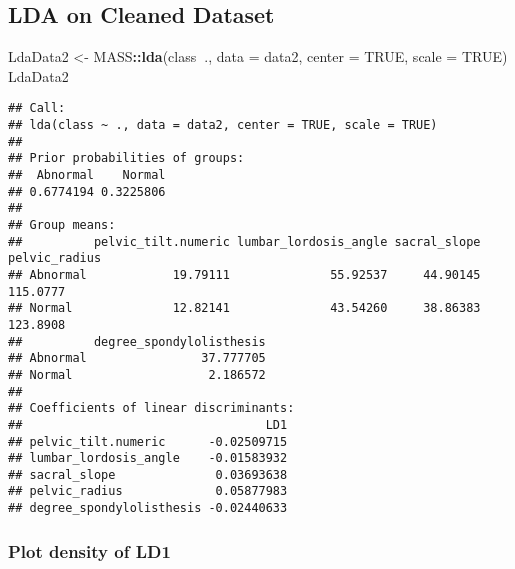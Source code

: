 \documentclass[
]{article}
\newenvironment{Shaded}{\begin{snugshade}}{\end{snugshade}}
\newcommand{\CommentTok}[1]{\textcolor[rgb]{0.56,0.35,0.01}{\textit{#1}}}
\newcommand{\DataTypeTok}[1]{\textcolor[rgb]{0.13,0.29,0.53}{#1}}
\newcommand{\KeywordTok}[1]{\textcolor[rgb]{0.13,0.29,0.53}{\textbf{#1}}}
\newcommand{\NormalTok}[1]{#1}
\newcommand{\OperatorTok}[1]{\textcolor[rgb]{0.81,0.36,0.00}{\textbf{#1}}}
\newcommand{\OtherTok}[1]{\textcolor[rgb]{0.56,0.35,0.01}{#1}}
\newcommand{\StringTok}[1]{\textcolor[rgb]{0.31,0.60,0.02}{#1}}
\begin{document}
\hypertarget{lda-on-cleaned-dataset}{%
\subsection{LDA on Cleaned Dataset}\label{lda-on-cleaned-dataset}}

\begin{Shaded}
\begin{Highlighting}[]
\NormalTok{LdaData2 <-}\StringTok{ }\NormalTok{MASS}\OperatorTok{::}\KeywordTok{lda}\NormalTok{(class}\OperatorTok{~}\NormalTok{., }\DataTypeTok{data =}\NormalTok{ data2, }\DataTypeTok{center =} \OtherTok{TRUE}\NormalTok{, }\DataTypeTok{scale =} \OtherTok{TRUE}\NormalTok{) }
\NormalTok{LdaData2}
\end{Highlighting}
\end{Shaded}

\begin{verbatim}
## Call:
## lda(class ~ ., data = data2, center = TRUE, scale = TRUE)
## 
## Prior probabilities of groups:
##  Abnormal    Normal 
## 0.6774194 0.3225806 
## 
## Group means:
##          pelvic_tilt.numeric lumbar_lordosis_angle sacral_slope pelvic_radius
## Abnormal            19.79111              55.92537     44.90145      115.0777
## Normal              12.82141              43.54260     38.86383      123.8908
##          degree_spondylolisthesis
## Abnormal                37.777705
## Normal                   2.186572
## 
## Coefficients of linear discriminants:
##                                  LD1
## pelvic_tilt.numeric      -0.02509715
## lumbar_lordosis_angle    -0.01583932
## sacral_slope              0.03693638
## pelvic_radius             0.05877983
## degree_spondylolisthesis -0.02440633
\end{verbatim}

\begin{Shaded}
\end{Shaded}

\hypertarget{plot-density-of-ld1-1}{%
\subsubsection{Plot density of LD1}\label{plot-density-of-ld1-1}}
\end{document}
